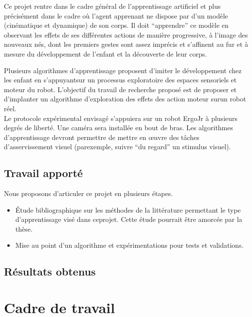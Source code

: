 \documentclass[11pt,french]{report}
\begin{document}
Ce projet rentre dans le cadre général de l’apprentissage artificiel et plus précisément dans le cadre où l’agent apprenant ne dispose par d’un modèle (cinématique et dynamique) de son corps. Il doit “apprendre” ce modèle en observant les effets de ses différentes actions de manière progressive, à l’image des nouveaux nés, dont les premiers gestes sont assez imprécis et s’affinent au fur et à mesure du développement de l’enfant et la découverte de leur corps.

Plusieurs algorithmes d’apprentissage proposent d’imiter le développement chez les enfant en s’appuyantsur un processus exploratoire des espaces sensoriels et moteur du robot. L’objectif du travail de recherche proposé est de proposer et d’implanter un algorithme d’exploration des effets des action moteur surun robot réel.\\[10pt]
Le protocole expérimental envisagé s’appuiera sur un robot ErgoJr à plusieurs degrés de liberté. Une caméra sera installée en bout de bras. Les algorithmes d’apprentissage devront permettre de mettre en œuvre des tâches d’asservissement visuel (parexemple, suivre “du regard” un stimulus visuel).


\section{Travail apporté}

Nous proposons d’articuler ce projet en plusieurs étapes.
\begin{itemize}
    \item Étude bibliographique sur les méthodes de la littérature permettant le type d’apprentissage visé dans ceprojet. Cette étude pourrait être amorcée par la thèse.
    \item Mise au point d’un algorithme et expérimentations pour tests et validations.
\end{itemize}

\section{Résultats obtenus}


\chapter{Cadre de travail}
\end{document}

